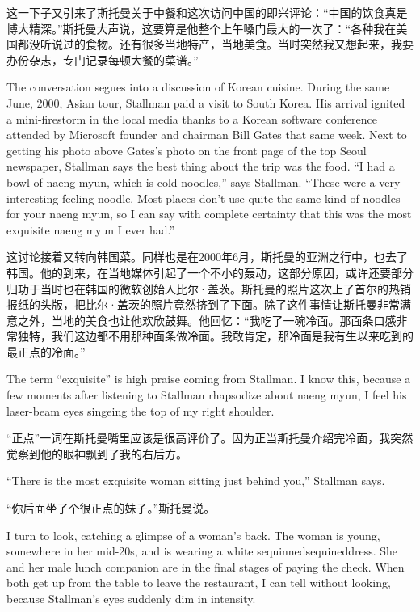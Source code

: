\ifdefined\chs
这一下子又引来了斯托曼关于中餐和这次访问中国的即兴评论：``中国的饮食真是博大精深。''斯托曼大声说，这要算是他整个上午嗓门最大的一次了：``各种我在美国都没听说过的食物。还有很多当地特产，当地美食。当时突然我又想起来，我要办份杂志，专门记录每顿大餐的菜谱。''
\fi

\ifdefined\eng
The conversation segues into a discussion of Korean cuisine. During the same June, 2000, Asian tour, Stallman paid a visit to South Korea. His arrival ignited a mini-firestorm in the local media thanks to a Korean software conference attended by Microsoft founder and chairman Bill Gates that same week. Next to getting his photo above Gates's photo on the front page of the top Seoul newspaper, Stallman says the best thing about the trip was the food. ``I had a bowl of naeng myun, which is cold noodles,'' says Stallman. ``These were a very interesting feeling noodle. Most places don't use quite the same kind of noodles for your naeng myun, so I can say with complete certainty that this was the most exquisite naeng myun I ever had.''
\fi

\ifdefined\chs
这讨论接着又转向韩国菜。同样也是在2000年6月，斯托曼的亚洲之行中，也去了韩国。他的到来，在当地媒体引起了一个不小的轰动，这部分原因，或许还要部分归功于当时也在韩国的微软创始人比尔·盖茨。斯托曼的照片这次上了首尔的热销报纸的头版，把比尔·盖茨的照片竟然挤到了下面。除了这件事情让斯托曼非常满意之外，当地的美食也让他欢欣鼓舞。他回忆：``我吃了一碗冷面。那面条口感非常独特，我们这边都不用那种面条做冷面。我敢肯定，那冷面是我有生以来吃到的最正点的冷面。''
\fi

\ifdefined\eng
The term ``exquisite'' is high praise coming from Stallman. I know this, because a few moments after listening to Stallman rhapsodize about naeng myun, I feel his laser-beam eyes singeing the top of my right shoulder.
\fi

\ifdefined\chs
``正点''一词在斯托曼嘴里应该是很高评价了。因为正当斯托曼介绍完冷面，我突然觉察到他的眼神飘到了我的右后方。
\fi

\ifdefined\eng
``There is the most exquisite woman sitting just behind you,'' Stallman says.
\fi

\ifdefined\chs
``你后面坐了个很正点的妹子。''斯托曼说。
\fi

\ifdefined\eng
I turn to look, catching a glimpse of a woman's back. The woman is young, somewhere in her mid-20s, and is wearing a white \ifdefined\vone sequinned\fi\ifdefined\vtwo sequined\fi dress. She and her male lunch companion are in the final stages of paying the check. When both get up from the table to leave the restaurant, I can tell without looking, because Stallman's eyes suddenly dim in intensity.
\fi

